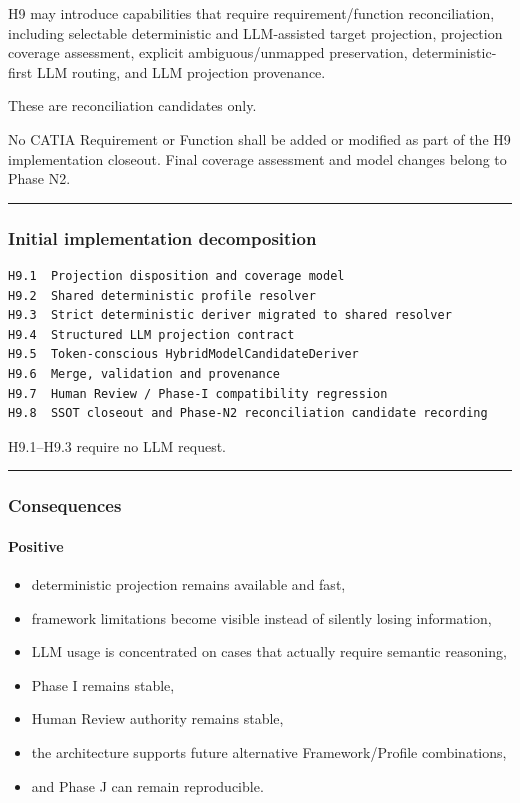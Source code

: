 H9 may introduce capabilities that require requirement/function reconciliation, including selectable deterministic and LLM-assisted target projection, projection coverage assessment, explicit ambiguous/unmapped preservation, deterministic-first LLM routing, and LLM projection provenance.

These are reconciliation candidates only.

No CATIA Requirement or Function shall be added or modified as part of the H9 implementation closeout. Final coverage assessment and model changes belong to Phase N2.

\begin{center}\rule{0.5\linewidth}{0.5pt}\end{center}

\hypertarget{initial-implementation-decomposition-1}{%
\subsubsection{Initial implementation decomposition}\label{initial-implementation-decomposition-1}}

\begin{verbatim}
H9.1  Projection disposition and coverage model
H9.2  Shared deterministic profile resolver
H9.3  Strict deterministic deriver migrated to shared resolver
H9.4  Structured LLM projection contract
H9.5  Token-conscious HybridModelCandidateDeriver
H9.6  Merge, validation and provenance
H9.7  Human Review / Phase-I compatibility regression
H9.8  SSOT closeout and Phase-N2 reconciliation candidate recording
\end{verbatim}

H9.1--H9.3 require no LLM request.

\begin{center}\rule{0.5\linewidth}{0.5pt}\end{center}

\hypertarget{consequences-5}{%
\subsubsection{Consequences}\label{consequences-5}}

\hypertarget{positive}{%
\paragraph{Positive}\label{positive}}

\begin{itemize}
\tightlist
\item
  deterministic projection remains available and fast,
\item
  framework limitations become visible instead of silently losing information,
\item
  LLM usage is concentrated on cases that actually require semantic reasoning,
\item
  Phase I remains stable,
\item
  Human Review authority remains stable,
\item
  the architecture supports future alternative Framework/Profile combinations,
\item
  and Phase J can remain reproducible.
\end{itemize}

